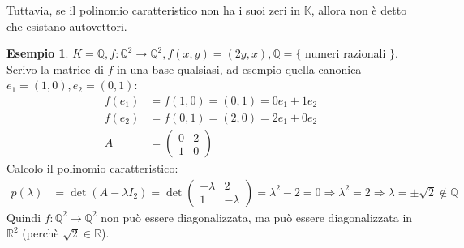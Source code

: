 \documentclass[a4paper]{article}
\theoremstyle{definition}
\newtheorem*{es}{Esempio}
\begin{document}
	Tuttavia, se il polinomio caratteristico non ha i suoi zeri in $\mathbb{K}$, allora non è detto che esistano autovettori.
	\begin{es}
		$K = \mathbb{Q}, f: \mathbb{Q}^2 \to \mathbb{Q}^2, f(x, y) = (2y, x), \mathbb{Q} = \{$ numeri razionali $\}$. \\
		Scrivo la matrice di $f$ in una base qualsiasi, ad esempio quella canonica $e_1 = (1, 0), e_2 = (0, 1)$:
		\begin{align*}
			f(e_1) &= f(1, 0) = (0, 1) = 0e_1 + 1e_2 \\
			f(e_2) &= f(0, 1) = (2, 0) = 2e_1 + 0e_2 \\
			A &= \begin{pmatrix}
				0 & 2 \\
				1 & 0
			\end{pmatrix}
		\end{align*}
		Calcolo il polinomio caratteristico:
		\begin{align*}
			p(\lambda) &= \det(A - \lambda I_2) = \det \begin{pmatrix}
				- \lambda & 2 \\
				1 & - \lambda
			\end{pmatrix} = \lambda^2 - 2 = 0 \Rightarrow \lambda^2 = 2 \Rightarrow \lambda = \pm \sqrt{2} \notin \mathbb{Q}
		\end{align*}
		Quindi $f: \mathbb{Q}^2 \to \mathbb{Q}^2$ non può essere diagonalizzata, ma può essere diagonalizzata in $\mathbb{R}^2$ (perchè $\sqrt{2} \in \mathbb{R}$).
	\end{es}
\end{document}
